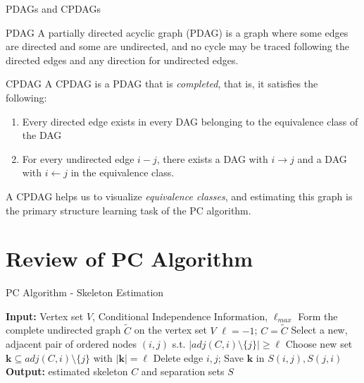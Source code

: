 \documentclass{beamer}
\begin{document}
\begin{frame}{PDAGs and CPDAGs}

\begin{exampleblock}{ PDAG }
A partially directed acyclic graph (PDAG) is a graph where some edges are directed and some are undirected, and no cycle may be traced following the directed edges and any direction for undirected edges.
\end{exampleblock}

\begin{exampleblock}{ CPDAG }
A CPDAG is a PDAG that is \textit{completed}, that is, it satisfies the following:
\begin{enumerate}
\item Every directed edge exists in every DAG belonging to the equivalence class of the DAG
\item For every undirected edge $i - j$, there exists a DAG with $i \rightarrow j$ and a DAG with $i \leftarrow j$ in the equivalence class.
\end{enumerate}
\end{exampleblock}
A CPDAG helps us to visualize \textit{equivalence classes}, and estimating this graph is the primary structure learning task of the PC algorithm.

\end{frame}





\section{Review of PC Algorithm}



\begin{frame}{PC Algorithm - Skeleton Estimation}


\begin{algorithm}[H]
\footnotesize
\caption{Population PC Algorithm}
\begin{algorithmic}[1]
\State \textbf{Input:} Vertex set $V$, Conditional Independence Information, $\ell_{max}$
\State Form the complete undirected graph $\tilde{C}$ on the vertex set $V$
\State $\ell = -1$; $C = \tilde{C}$
\Do
\State Select a new, adjacent pair of ordered nodes $(i,j)$ s.t. $|adj(C,i) \setminus \{j\}| \geq \ell$
\Do
\State Choose new set $\mathbf{k} \subseteq adj(C,i)\setminus \{j\}$ with $|\mathbf{k}|=\ell$
\State Delete edge $i,j$; Save $\mathbf{k}$ in $S(i,j), S(j,i)$
\EndIf
{}
\EndWhile
\State \textbf{Output:} estimated skeleton $C$ and separation sets $S$
\end{algorithmic}
\end{algorithm}


\end{frame}
\end{document}
